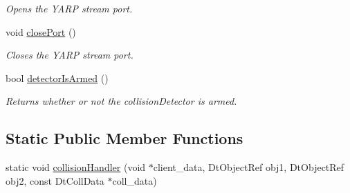 \begin{DoxyCompactItemize}
\begin{DoxyCompactList}\small\item\em Opens the YARP stream port. \item\end{DoxyCompactList}\item 
void \hyperlink{class_collision_detector_a2a9b9c210d15989278ec9ff3e88b67c7}{closePort} ()
\begin{DoxyCompactList}\small\item\em Closes the YARP stream port. \item\end{DoxyCompactList}\item 
bool \hyperlink{class_collision_detector_adda71d45cdd4a428945f6a8e9c750296}{detectorIsArmed} ()
\begin{DoxyCompactList}\small\item\em Returns whether or not the collisionDetector is armed. \item\end{DoxyCompactList}\end{DoxyCompactItemize}
\subsection*{Static Public Member Functions}
\begin{DoxyCompactItemize}
\item 
static void \hyperlink{class_collision_detector_a4899ce7cf1ba8c2efe37329e49aff128}{collisionHandler} (void $\ast$client\_\-data, DtObjectRef obj1, DtObjectRef obj2, const DtCollData $\ast$coll\_\-data)
\end{DoxyCompactItemize}


